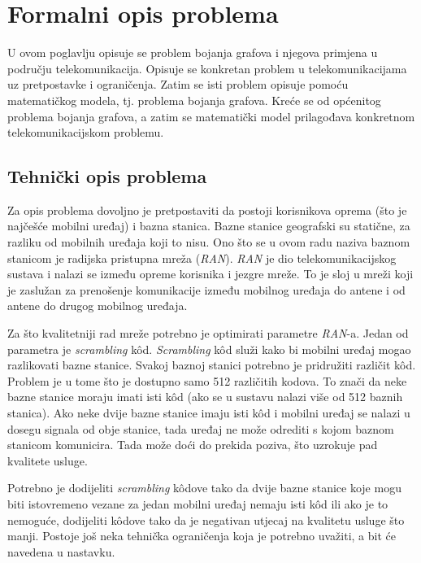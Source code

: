 \documentclass[times, utf8, diplomski, numeric]{fer}
\begin{document}
\chapter{Formalni opis problema}

U ovom poglavlju opisuje se problem bojanja grafova i njegova primjena u području telekomunikacija. Opisuje se konkretan problem u telekomunikacijama uz pretpostavke i ograničenja. Zatim se isti problem opisuje pomoću matematičkog modela, tj. problema bojanja grafova. Kreće se od općenitog problema bojanja grafova, a zatim se matematički model prilagođava konkretnom telekomunikacijskom problemu.

\section{Tehnički opis problema}

Za opis problema dovoljno je pretpostaviti da postoji korisnikova oprema (što je najčešće mobilni uređaj) i bazna stanica. Bazne stanice geografski su statične, za razliku od mobilnih uređaja koji to nisu.
Ono što se u ovom radu naziva baznom stanicom je radijska pristupna mreža  (\emph{RAN}). \emph{RAN} je dio telekomunikacijskog sustava i nalazi se između opreme korisnika i jezgre mreže. To je sloj u mreži koji je zaslužan za prenošenje komunikacije između mobilnog uređaja do antene i od antene do drugog mobilnog uređaja. 

Za što kvalitetniji rad mreže potrebno je optimirati parametre \emph{RAN}-a. Jedan od parametra je \emph{scrambling} k\^{o}d. \emph{Scrambling} k\^{o}d služi kako bi mobilni uređaj mogao razlikovati bazne stanice. Svakoj baznoj stanici potrebno je pridružiti različit k\^{o}d. Problem je u tome što je dostupno samo 512 različitih kodova. To znači da neke bazne stanice moraju imati isti k\^{o}d (ako se u sustavu nalazi više od 512 baznih stanica). Ako neke dvije bazne stanice imaju isti k\^{o}d i mobilni uređaj se nalazi u dosegu signala od obje stanice, tada uređaj ne može odrediti s kojom baznom stanicom komunicira. Tada može doći do prekida poziva, što uzrokuje pad kvalitete usluge.

Potrebno je dodijeliti \emph{scrambling} k\^{o}dove tako da dvije bazne stanice koje mogu biti istovremeno vezane za jedan mobilni uređaj nemaju isti k\^{o}d ili ako je to nemoguće, dodijeliti k\^{o}dove tako da je negativan utjecaj na kvalitetu usluge što manji. Postoje još neka tehnička ograničenja koja je potrebno uvažiti, a bit će navedena u nastavku.
\end{document}
